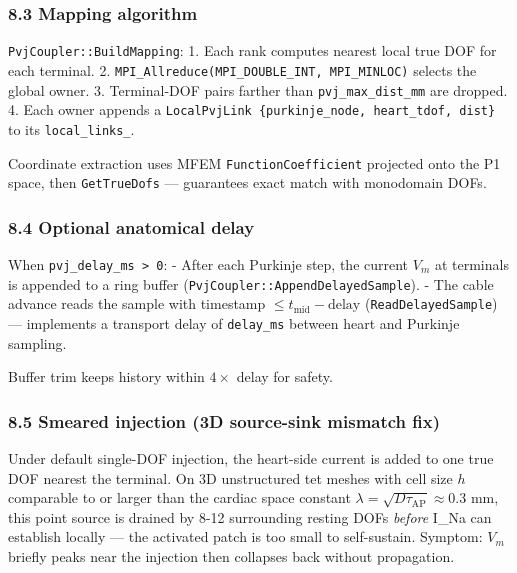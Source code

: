\documentclass[
  11pt,
]{article}
\begin{document}
\hypertarget{mapping-algorithm}{%
\subsubsection{8.3 Mapping algorithm}\label{mapping-algorithm}}

\texttt{PvjCoupler::BuildMapping}: 1. Each rank computes nearest local
true DOF for each terminal. 2.
\texttt{MPI\_Allreduce(MPI\_DOUBLE\_INT,\ MPI\_MINLOC)} selects the
global owner. 3. Terminal-DOF pairs farther than
\texttt{pvj\_max\_dist\_mm} are dropped. 4. Each owner appends a
\texttt{LocalPvjLink\ \{purkinje\_node,\ heart\_tdof,\ dist\}} to its
\texttt{local\_links\_}.

Coordinate extraction uses MFEM \texttt{FunctionCoefficient} projected
onto the P1 space, then \texttt{GetTrueDofs} --- guarantees exact match
with monodomain DOFs.

\hypertarget{optional-anatomical-delay}{%
\subsubsection{8.4 Optional anatomical
delay}\label{optional-anatomical-delay}}

When \texttt{pvj\_delay\_ms\ \textgreater{}\ 0}: - After each Purkinje
step, the current \(V_m\) at terminals is appended to a ring buffer
(\texttt{PvjCoupler::AppendDelayedSample}). - The cable advance reads
the sample with timestamp \(\le t_\mathrm{mid} -  \mathrm{delay}\)
(\texttt{ReadDelayedSample}) --- implements a transport delay of
\texttt{delay\_ms} between heart and Purkinje sampling.

Buffer trim keeps history within \(4\times\) delay for safety.

\hypertarget{smeared-injection-3d-source-sink-mismatch-fix}{%
\subsubsection{8.5 Smeared injection (3D source-sink mismatch
fix)}\label{smeared-injection-3d-source-sink-mismatch-fix}}

Under default single-DOF injection, the heart-side current is added to
one true DOF nearest the terminal. On 3D unstructured tet meshes with
cell size \(h\) comparable to or larger than the cardiac space constant
\(\lambda = \sqrt{D \tau_\mathrm{AP}} \approx 0.3\) mm, this point
source is drained by 8-12 surrounding resting DOFs \emph{before} I\_Na
can establish locally --- the activated patch is too small to
self-sustain. Symptom: \(V_m\) briefly peaks near the injection then
collapses back without propagation.
\end{document}
